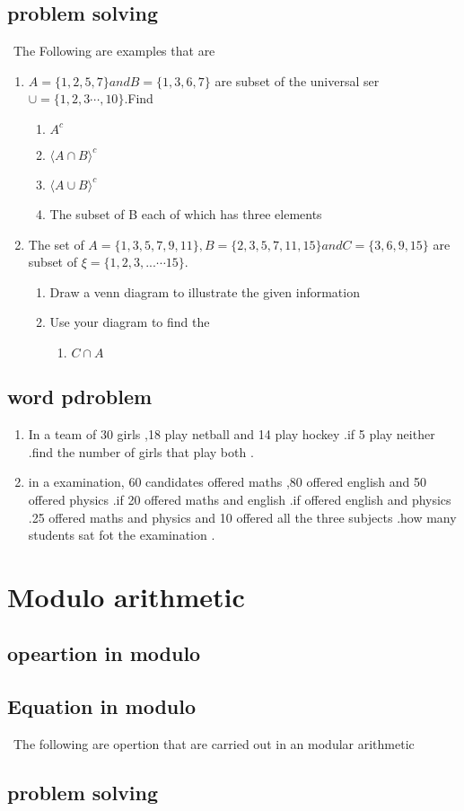 \documentclass[15pt,a4paper]{article}
\begin{document}
\subsection{problem solving }
\ The Following are examples that are
\begin{enumerate}
 \item  $A=\lbrace 1,2 ,5,7\rbrace and  B=\lbrace1,3,6,7\rbrace $ are subset of the universal ser $\cup =\lbrace1,2,3\cdots,10\rbrace$.Find 
 \begin{enumerate}
 \item  $  A^{c}$
 \item $\langle A\cap B\rangle^{c}$
 \item $\langle A\cup B\rangle^{c} $
 \item The subset of B each of which has three elements 
 \end{enumerate}
 \item The set of $ A=\lbrace1,3,5,7,9,11\rbrace ,B=\lbrace 2,3,5,7,11,15\rbrace and C=\lbrace 3,6,9,15\rbrace $ are subset of $\xi=\lbrace1,2,3,...\cdots 15\rbrace $.
 \begin{enumerate}
 \item Draw a venn diagram to illustrate the given information 
 \item Use your diagram to find the 
 \begin{enumerate}
  \item $ C\cap A $
 \end{enumerate}
  \end{enumerate}
 \end{enumerate}
\subsection{word pdroblem}
\begin{enumerate}
\item In a team of 30 girls ,18 play netball and 14 play hockey .if 5 play neither .find the number of girls that play both .
\item in a examination, 60 candidates offered maths ,80 offered english  and 50 offered physics .if 20 offered maths and english .if offered english and physics .25 offered maths and physics and 10 offered all the three subjects .how many students sat fot the examination .
   
\end{enumerate}

\section{Modulo arithmetic}
\subsection{opeartion in modulo}
\subsection{Equation in modulo}
\ The following are opertion that are carried out in an modular arithmetic
\subsection{problem solving }
\end{document}
